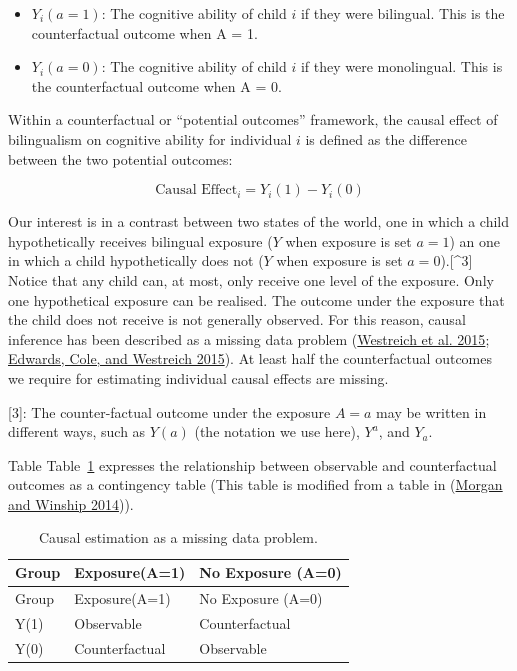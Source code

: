 \documentclass[
  singlecolumn]{report}
\providecommand{\tightlist}{%
  \setlength{\itemsep}{0pt}\setlength{\parskip}{0pt}}\usepackage{longtable,booktabs,array}
\begin{document}
\begin{itemize}
\tightlist
\item
  \(Y_i(a = 1)\): The cognitive ability of child \(i\) if they were
  bilingual. This is the counterfactual outcome when A = 1.
\item
  \(Y_i(a = 0)\): The cognitive ability of child \(i\) if they were
  monolingual. This is the counterfactual outcome when A = 0.
\end{itemize}

Within a counterfactual or ``potential outcomes'' framework, the causal
effect of bilingualism on cognitive ability for individual \(i\) is
defined as the difference between the two potential outcomes:

\[
\text{Causal Effect}_i = Y_i(1) - Y_i(0) 
\]

Our interest is in a contrast between two states of the world, one in
which a child hypothetically receives bilingual exposure (\(Y\) when
exposure is set \(a=1\)) an one in which a child hypothetically does not
(\(Y\) when exposure is set \(a=0\)).{[}\^{}3{]} Notice that any child
can, at most, only receive one level of the exposure. Only one
hypothetical exposure can be realised. The outcome under the exposure
that the child does not receive is not generally observed. For this
reason, causal inference has been described as a missing data problem
(\protect\hyperlink{ref-westreich2015}{Westreich et al. 2015};
\protect\hyperlink{ref-edwards2015}{Edwards, Cole, and Westreich 2015}).
At least half the counterfactual outcomes we require for estimating
individual causal effects are missing.

{[}3{]}: The counter-factual outcome under the exposure \(A = a\) may be
written in different ways, such as \(Y(a)\) (the notation we use here),
\(Y^a\), and \(Y_a\).

Table Table~\ref{tbl-consistency} expresses the relationship between
observable and counterfactual outcomes as a contingency table (This
table is modified from a table in
(\protect\hyperlink{ref-morgan2014}{Morgan and Winship 2014})).

\hypertarget{tbl-consistency}{}
\begin{longtable}[]{@{}lll@{}}
\caption{\label{tbl-consistency}Causal estimation as a missing data
problem.}\tabularnewline
\toprule\noalign{}
Group & Exposure(A=1) & No Exposure (A=0) \\
\midrule\noalign{}
\endfirsthead
\toprule\noalign{}
Group & Exposure(A=1) & No Exposure (A=0) \\
\midrule\noalign{}
\endhead
\bottomrule\noalign{}
\endlastfoot
Y(1) & Observable & Counterfactual \\
Y(0) & Counterfactual & Observable \\
\end{longtable}
\end{document}
